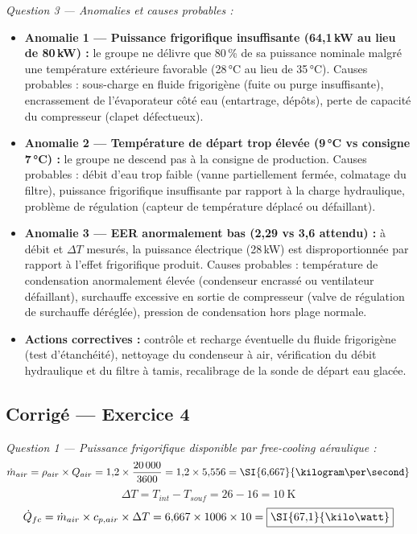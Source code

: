 \textit{Question 3 — Anomalies et causes probables :}
\begin{itemize}
  \item \textbf{Anomalie 1 — Puissance frigorifique insuffisante (64,1\,kW au lieu de 80\,kW) :}
    le groupe ne délivre que 80\,\% de sa puissance nominale malgré une température extérieure favorable (28\,°C au lieu de 35\,°C). Causes probables : sous-charge en fluide frigorigène (fuite ou purge insuffisante), encrassement de l'évaporateur côté eau (entartrage, dépôts), perte de capacité du compresseur (clapet défectueux).
  \item \textbf{Anomalie 2 — Température de départ trop élevée (9\,°C vs consigne 7\,°C) :}
    le groupe ne descend pas à la consigne de production. Causes probables : débit d'eau trop faible (vanne partiellement fermée, colmatage du filtre), puissance frigorifique insuffisante par rapport à la charge hydraulique, problème de régulation (capteur de température déplacé ou défaillant).
  \item \textbf{Anomalie 3 — EER anormalement bas (2,29 vs 3,6 attendu) :}
    à débit et $\Delta T$ mesurés, la puissance électrique (28\,kW) est disproportionnée par rapport à l'effet frigorifique produit. Causes probables : température de condensation anormalement élevée (condenseur encrassé ou ventilateur défaillant), surchauffe excessive en sortie de compresseur (valve de régulation de surchauffe déréglée), pression de condensation hors plage normale.
  \item \textbf{Actions correctives :} contrôle et recharge éventuelle du fluide frigorigène (test d'étanchéité), nettoyage du condenseur à air, vérification du débit hydraulique et du filtre à tamis, recalibrage de la sonde de départ eau glacée.
\end{itemize}

\subsection*{Corrigé — Exercice 4}

\textit{Question 1 — Puissance frigorifique disponible par free-cooling aéraulique :}
\[
  \dot{m}_{air} = \rho_{air} \times Q_{air} = 1{,}2 \times \frac{20\,000}{3600} = 1{,}2 \times 5{,}556 = \SI{6{,}667}{\kilogram\per\second}
\]
\[
  \Delta T = T_{int} - T_{souf} = 26 - 16 = \SI{10}{\kelvin}
\]
\[
  \dot{Q}_{fc} = \dot{m}_{air} \times c_{p,air} \times \Delta T = 6{,}667 \times 1006 \times 10 = \boxed{\SI{67{,}1}{\kilo\watt}}
\]

